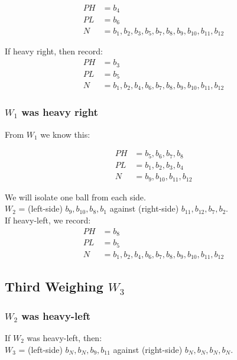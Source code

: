 \documentclass[12pt]{article}
\begin{document}
\begin{align*}
PH &= {b_4}\\
PL &= {b_6}\\
N  &= {b_1, b_2, b_3, b_5, b_7, b_8, b_9, b_{10}, b_{11}, b_{12}}
\end{align*}

If heavy right, then record:
\begin{align*}
PH &= {b_3}\\
PL &= {b_5}\\
N  &= {b_1, b_2, b_4, b_6, b_7, b_8, b_9, b_{10}, b_{11}, b_{12}}
\end{align*}

\subsubsection*{$W_1$ was heavy right}

From $W_1$ we know this:

\begin{align*}
PH &= {b_5, b_6, b_7, b_8}\\
PL &= {b_1, b_2, b_3, b_4}\\
N  &= {b_9, b_{10}, b_{11}, b_{12}}
\end{align*}

We will isolate one ball from each side. \\
$W_2$ = (left-side) ${b_9, b_{10}, b_8, b_1}$ against (right-side) ${b_{11}, b_{12}, b_7, b_2}$.\\


If heavy-left, we record:
\begin{align*}
PH &= {b_8}\\
PL &= {b_5}\\
N  &= {b_1, b_2, b_4, b_6, b_7, b_8, b_9, b_{10}, b_{11}, b_{12}}
\end{align*}



\subsection*{Third Weighing $W_3$}

\subsubsection*{$W_2$ was heavy-left}

If $W_2$ was heavy-left, then:\\

${W_3}$ = (left-side) ${b_N, b_N, b_9, b_{11}}$ against (right-side) ${b_N, b_N, b_N, b_N}$.\\
\end{document}
